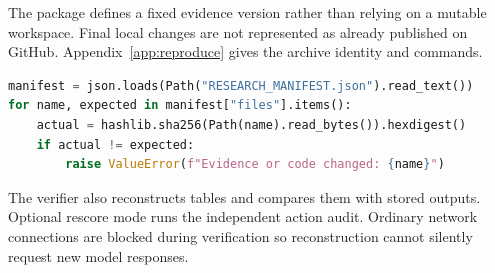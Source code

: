 The package defines a fixed evidence version rather than relying on a mutable workspace. Final local changes are not represented as already published on GitHub. Appendix~\ref{app:reproduce} gives the archive identity and commands.
\begin{lstlisting}[language=Python,caption={Abbreviated integrity check from the offline verifier.}]
manifest = json.loads(Path("RESEARCH_MANIFEST.json").read_text())
for name, expected in manifest["files"].items():
    actual = hashlib.sha256(Path(name).read_bytes()).hexdigest()
    if actual != expected:
        raise ValueError(f"Evidence or code changed: {name}")
\end{lstlisting}
The verifier also reconstructs tables and compares them with stored outputs. Optional rescore mode runs the independent action audit. Ordinary network connections are blocked during verification so reconstruction cannot silently request new model responses.
